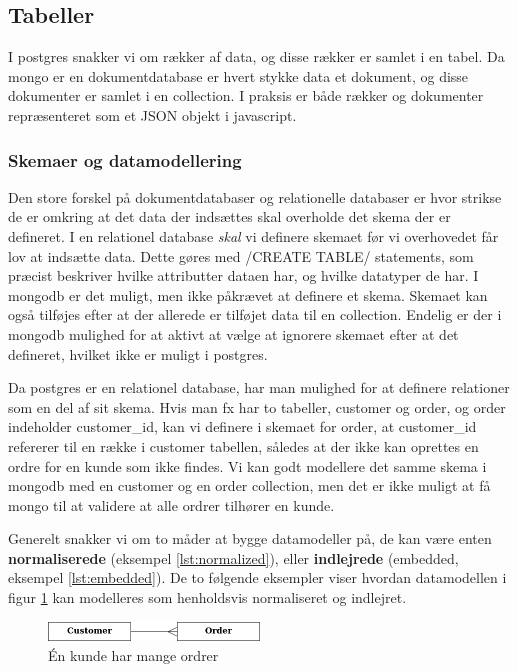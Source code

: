\documentclass[english,course]{lecture}
\begin{document}
\subsection{Tabeller}
I postgres snakker vi om rækker af data, og disse rækker er samlet i en tabel. Da mongo er en dokumentdatabase er hvert stykke data et dokument, og disse dokumenter er samlet i en collection. I praksis er både rækker og dokumenter repræsenteret som et JSON objekt i javascript.


\subsubsection{Skemaer og datamodellering}
Den store forskel på dokumentdatabaser og relationelle databaser er hvor strikse de er omkring at det data der indsættes skal overholde det skema der er defineret. I en relationel database \textit{skal} vi definere skemaet før vi overhovedet får lov at indsætte data. Dette gøres med \sqlinline/CREATE TABLE/ statements, som præcist beskriver hvilke attributter dataen har, og hvilke datatyper de har. 
I mongodb er det muligt, men ikke påkrævet at definere et skema. Skemaet kan også tilføjes efter at der allerede er tilføjet data til en collection. Endelig er der i mongodb mulighed for at aktivt at vælge at ignorere skemaet efter at det defineret, hvilket ikke er muligt i postgres.

Da postgres er en relationel database, har man mulighed for at definere relationer som en del af sit skema. Hvis man fx har to tabeller, customer og order, og order indeholder customer\_id, kan vi definere i skemaet for order, at customer\_id refererer til en række i customer tabellen, således at der ikke kan oprettes en ordre for en kunde som ikke findes. Vi kan godt modellere det samme skema i mongodb med en customer og en order collection, men det er ikke muligt at få mongo til at validere at alle ordrer tilhører en kunde. 

Generelt snakker vi om to måder at bygge datamodeller på, de kan være enten \textbf{normaliserede} (eksempel \ref{lst:normalized}), eller \textbf{indlejrede} (embedded, eksempel \ref{lst:embedded}). De to følgende eksempler viser hvordan datamodellen i figur \ref{fig:er} kan modelleres som henholdsvis normaliseret og indlejret.

\begin{figure}[H]
\caption{Én kunde har mange ordrer}
\label{fig:er}
\centering
\includegraphics[width=0.5\textwidth]{er}
\end{figure}
\end{document}
